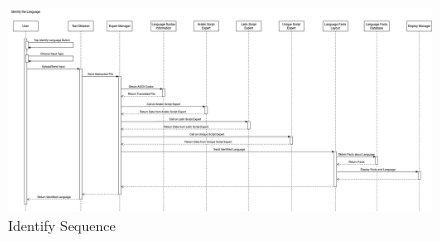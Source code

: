 \begin{figure}[H]
	\centering
	\includegraphics[width=\textwidth, height=\textheight, keepaspectratio]{Section3/images/IdentifyLanguageSequenceDiagram.drawio.png}
	\caption{Identify Sequence}
	\label{IdentifySequence}
\end{figure}